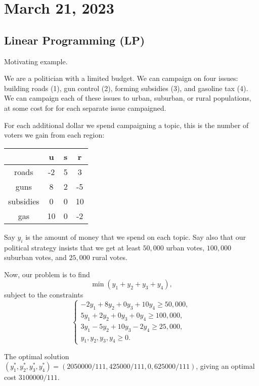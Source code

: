 \section{March 21, 2023}

\subsection{Linear Programming (LP)}

\begin{example}
\exlabel

Motivating example.
\end{example}

We are a politician with a limited budget. We can campaign on four issues: building roads (1), gun control (2), forming subsidies (3), and gasoline tax (4). We can campaign each of these issues to urban, suburban, or rural populations, at some cost for for each separate issue campaigned. 

For each additional dollar we spend campaigning a topic, this is the number of voters we gain from each region: 

\begin{center}
\begin{tabular}{|c|c|c|c|}
\hline
     & u & s & r \\
\hline
    roads & -2 & 5 & 3 \\
\hline
    guns & 8 & 2 & -5\\
\hline 
    subsidies & 0 & 0 & 10\\
\hline
    gas & 10 & 0 & -2\\
\hline
\end{tabular}
\end{center}

Say $y_i$ is the amount of money that we spend on each topic. Say also that our political strategy insists that we get at least $50,000$ urban votes, $100,000$ suburban votes, and $25,000$ rural votes. 

Now, our problem is to find 
\[\min{(y_1+y_2+y_3+y_4)},\]
subject to the constraints 
\[\begin{cases}
-2y_1+8y_2+0y_3+10y_4\geq 50,000,\\
5y_1+2y_2+0y_3+0y_4\geq 100,000,\\
3y_1-5y_2+10y_3-2y_4\geq 25,000,\\
y_1, y_2, y_3, y_4\geq 0.
\end{cases}\]

The optimal solution $(y_1^*, y_2^*, y_3^*, y_4^*)=(2050000/111, 425000/111, 0, 625000/111)$, giving an optimal cost $3100000/111$.


